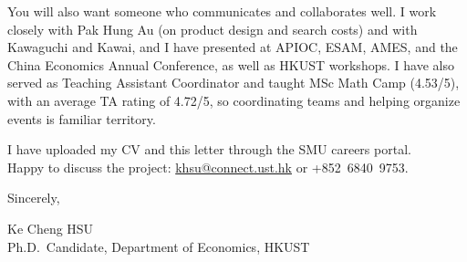 \documentclass[11pt]{article}
\begin{document}
You will also want someone who communicates and collaborates well. I work closely with Pak Hung Au (on product design and search costs) and with Kawaguchi and Kawai, and I have presented at APIOC, ESAM, AMES, and the China Economics Annual Conference, as well as HKUST workshops. I have also served as Teaching Assistant Coordinator and taught MSc Math Camp (4.53/5), with an average TA rating of 4.72/5, so coordinating teams and helping organize events is familiar territory.

I have uploaded my CV and this letter through the SMU careers portal.\\
Happy to discuss the project: \href{mailto:khsu@connect.ust.hk}{khsu@connect.ust.hk} or +852~6840~9753.

\vspace{0.18em}
Sincerely,

\vspace{0.18em}
Ke Cheng HSU \\
Ph.D.\ Candidate, Department of Economics, HKUST
\end{document}
